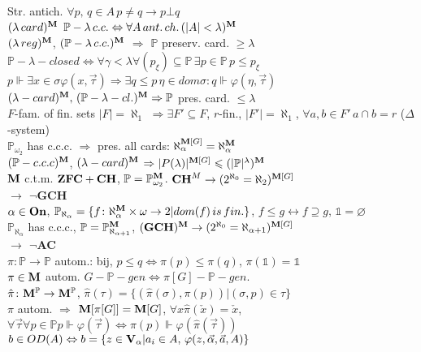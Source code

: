 \documentclass[9pt]{article}
\newcommand{\class}[1]{{\bf #1}}
\newcommand{\Pp}{\mathbb{P}}
\newcommand{\mytitle}[1]{ {\bf $\rightarrow$ #1}\\}
\newcommand{\On}{\class{On}}
\newcommand{\V}{\class{V}}
\newcommand{\M}{\class{M}}
\begin{document}
\begin{multicols*}{2}
Str. antich. $\forall p,\,q\in A\,p\neq q\to p\bot q$\\
$(\lambda\,card)^\M$ $\Pp-\lambda\,c.c.\Leftrightarrow\forall A\,ant.\,ch.\, (|A|<\lambda)^\M$\\
$(\lambda\,reg)^\M$, $(\Pp-\lambda\,c.c.)^\M$ $\Rightarrow$ $\Pp$ preserv. card. $\geqslant\lambda$\\
$\Pp-\lambda-closed\Leftrightarrow\forall\gamma<\lambda\forall (p_\xi)\subseteq\Pp\,\exists p\in \Pp\,p\leqslant p_\xi$\\
$p\Vdash\exists x\in\sigma \varphi(x,\vec{\tau})\Rightarrow\exists q\leqslant p\,\eta\in dom\sigma\colon q\Vdash \varphi(\eta,\vec{\tau})$\\
$(\lambda-card)^\M,\,(\Pp-\lambda-cl.)^\M\Rightarrow\Pp$ pres. card. $\leqslant\lambda$\\
$F$-fam. of fin. sets $|F|=\aleph_1$ $\Rightarrow\exists F'\subseteq F$, $r$-fin., $|F'|=\aleph_1$, $\forall a, b\in F'\,a\cap b=r$ ($\Delta$-system)\\
$\Pp_{\omega_2}$ has c.c.c. $\Rightarrow$ pres. all cards: $\aleph_\alpha^{\M[G]}=\aleph_\alpha^\M$\\
$(\Pp-c.c.c)^\M$, $(\lambda-card)^\M$ $\Rightarrow|P(\lambda)|^{\M[G]}\leqslant(|\Pp|^\lambda)^\M$\\
$\M$ c.t.m. $\class{ZFC}+\class{CH}$, $\Pp=\Pp_{\omega_2}^\M$. $\class{CH}^M\to(2^{\aleph_0}=\aleph_2)^{\M[G]}$\\
\mytitle{$\neg$\class{GCH}}
$\alpha\in\On$, $\Pp_{\aleph_\alpha}=\{f\colon\aleph_\alpha^\M\times\omega\to2|dom(f)\,is\,fin.\}$, $f\leqslant g\leftrightarrow f\supseteq g,\,\mathbb{1}=\varnothing$\\
$\Pp_{\aleph_\alpha}$ has c.c.c., $\Pp=\Pp_{\aleph_{\alpha+1}}^\M$, $(\class{GCH})^\M\to(2^{\aleph_0}=\aleph_{\alpha+1})^{\M[G]}$\\
\mytitle{$\neg$\class{AC}}
$\pi\colon \Pp\to\Pp$ autom.: bij, $p\leqslant q\Leftrightarrow \pi(p)\leqslant \pi(q)$, $\pi(\mathbb{1})=\mathbb{1}$\\
$\pi\in \M$ autom. $G-\Pp-gen\Leftrightarrow\pi[G]-\Pp-gen.$\\
$\hat{\pi}\colon \M^\Pp\to\M^\Pp$, $\hat{\pi}(\tau)=\{(\hat{\pi}(\sigma),\pi(p))|(\sigma,p)\in\tau\}$\\
$\pi$ autom. $\Rightarrow$ $\M[\pi[G]]=\M[G]$, $\forall x\hat{\pi}(\check{x})=\check{x}$, $\forall\vec{\tau}\forall p\in\Pp p\Vdash\varphi(\vec{\tau})\Leftrightarrow\pi(p)\Vdash\varphi(\hat{\pi}(\vec{\tau}))$\\
$b\in OD(A)\Leftrightarrow b=\{z\in \V_\alpha |a_i\in A,\,\varphi(z,\vec{\alpha},\vec{a},A)\}$\\

\end{multicols*}
\end{document}
